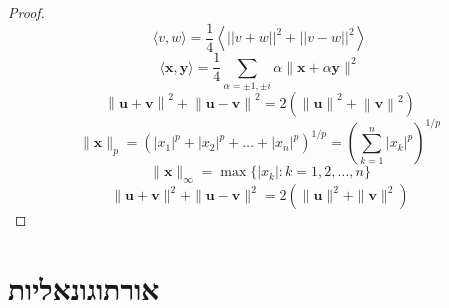 \documentclass{tstextbook}
\begin{document}
\begin{proof}
$$\langle v,w \rangle = \frac{1}{4}\left\langle||v+w||^2 + ||v-w||^2\right\rangle$$$$\langle\mathbf{x},\mathbf{y}\rangle={\frac{1}{4}}\sum_{\alpha=\pm1,\pm i}\alpha\|\mathbf{x}+\alpha\mathbf{y}\|^{2}$$$$\left\|\mathbf{u}+\mathbf{v}\right\|^{2}+\left\|\mathbf{u}-\mathbf{v}\right\|^{2}=2(\left\|\mathbf{u}\right\|^{2}+\left\|\mathbf{v}\right\|^{2})$$$$\|\mathbf{x}\|_{p}=(|x_{1}|^{p}+|x_{2}|^{p}+\ldots+|x_{n}|^{p})^{1/p}=\left(\sum_{k=1}^{n}|x_{k}|^{p}\right)^{1/p}$$$$\|\mathbf{x}\|_{\infty}=\operatorname*{max}\{|x_{k}|:k=1,2,\ldots,n\}$$$$\|\mathbf{u}+\mathbf{v}\|^{2}+\|\mathbf{u}-\mathbf{v}\|^{2}=2(\|\mathbf{u}\|^{2}+\|\mathbf{v}\|^{2})$$

\end{proof}
\section{אורתוגונאליות}
\end{document}
